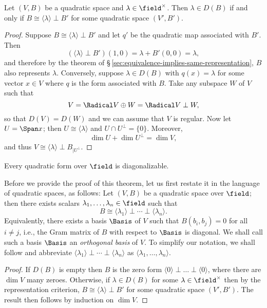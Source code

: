 \begin{lemma}
    {\normalfont \cite[p.~9]{lam1973quadratic}}
    Let \((V, B)\) be a quadratic space and \(\lambda \in \field^{\times}\). Then \(\lambda \in D(B)\) if and only if \(B \cong \langle \lambda \rangle \perp B'\) for some quadratic space \((V', B')\).
\end{lemma}

\begin{proof}
  Suppose \(B \cong \langle \lambda \rangle \perp B'\) and let \(q'\) be the quadratic map associated with \(B'\). Then
  \[
    (\langle \lambda \rangle \perp B') (1, 0) = \lambda + B'(0,0) = \lambda,
  \]
  and therefore by the theorem of \S\,\ref{sec:equivalence-implies-same-representation}, \(B\) also represents \(\lambda\). Conversely, suppose \(\lambda \in D(B)\) with \(q(x) = \lambda\) for some vector \(x \in V\) where \(q\) is the form associated with \(B\). Take any subspace \(W\) of \(V\) such that
  \[
    V = \Radical V \oplus W = \Radical V \perp W,
  \]
  so that \(D(V) = D(W)\) and we can assume that \(V\) is regular. Now let \(U = \Span x\); then \(U \cong \langle \lambda \rangle\) and \(U \cap U^{\perp} = \{0\}\). Moreover,
  \[
    \dim U + \dim U^{\perp} = \dim V,
  \]
  and thus \(V \cong \langle \lambda \rangle \perp B_{|U^{\perp}}\).
\end{proof}

\begin{theorem}
    Every quadratic form over \(\field\) is diagonalizable.
\end{theorem}

Before we provide the proof of this theorem, let us first restate it in the language of quadratic spaces, as follows: Let \((V, B)\) be a quadratic space over \(\field\); then there exists scalars \(\lambda_1, \dots, \lambda_n \in \field\) such that
\[
  B \cong \langle \lambda_1 \rangle \perp \cdots \perp \langle \lambda_n \rangle.  
\]
Equivalently, there exists a basis \(\Basis\) of \(V\) such that \(B(b_i, b_j) = 0\) for all \(i \neq j\), i.e., the Gram matrix of \(B\) with respect to \(\Basis\) is diagonal. We shall call such a basis \(\Basis\) an \emph{orthogonal basis} of \(V\). To simplify our notation, we shall follow \cite{lam1973quadratic} and abbreviate \(\langle \lambda_1 \rangle \perp \cdots \perp \langle \lambda_n \rangle\) as \(\langle \lambda_1, \dots, \lambda_n \rangle\).\label{sec:lambda-class}

\smallskip

\begin{proof}
  If \(D(B)\) is empty then \(B\) is the zero form \(\langle 0 \rangle \perp \dots \perp \langle 0 \rangle\), where there are \(\dim V\) many zeroes. Otherwise, if \(\lambda \in D(B)\) for some \(\lambda \in \field^{\times}\) then by the representation criterion, \(B \cong \langle \lambda \rangle \perp B'\) for some quadratic space \((V', B')\). The result then follows by induction on \(\dim V\).
\end{proof}

